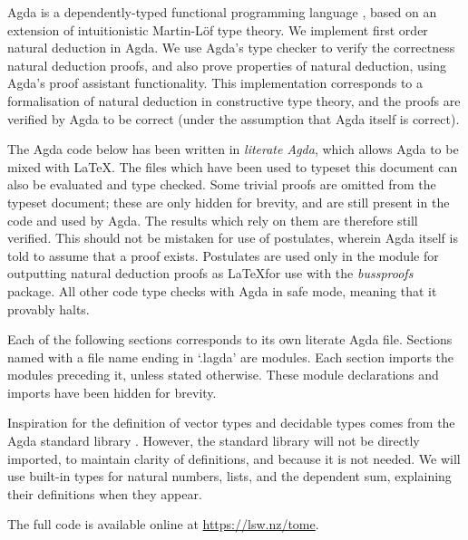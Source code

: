 Agda \citep{agdawiki} is a dependently-typed functional programming language
\citep{norellthesis}, based on an extension of intuitionistic Martin-L{\"o}f
type theory. We implement first order natural deduction in Agda. We use Agda's
type checker to verify the correctness natural deduction proofs, and also prove
properties of natural deduction, using Agda's proof assistant functionality.
This implementation corresponds to a formalisation of natural deduction in
constructive type theory, and the proofs are verified by Agda to be correct
(under the assumption that Agda itself is correct).

The Agda code below has been written in \emph{literate Agda}, which allows Agda
to be mixed with \LaTeX. The files which have been used to typeset this document
can also be evaluated and type checked. Some trivial proofs are omitted from the
typeset document; these are only hidden for brevity, and are still present in
the code and used by Agda. The results which rely on them are therefore still
verified. This should not be mistaken for use of postulates, wherein Agda itself
is told to assume that a proof exists. Postulates are used only in the module
for outputting natural deduction proofs as \LaTeX for use with the
\emph{bussproofs} package. All other code type checks with Agda in safe mode,
meaning that it provably halts.

Each of the following sections corresponds to its own literate Agda file.
Sections named with a file name ending in `.lagda' are modules. Each section
imports the modules preceding it, unless stated otherwise. These module
declarations and imports have been hidden for brevity.

Inspiration for the definition of vector types and decidable types comes from
the Agda standard library \citep{agdastdlib}. However, the standard library will
not be directly imported, to maintain clarity of definitions, and because it is
not needed. We will use built-in types for natural numbers, lists, and the
dependent sum, explaining their definitions when they appear.

The full code is available online at {\small \url{https://lsw.nz/tome}}.
